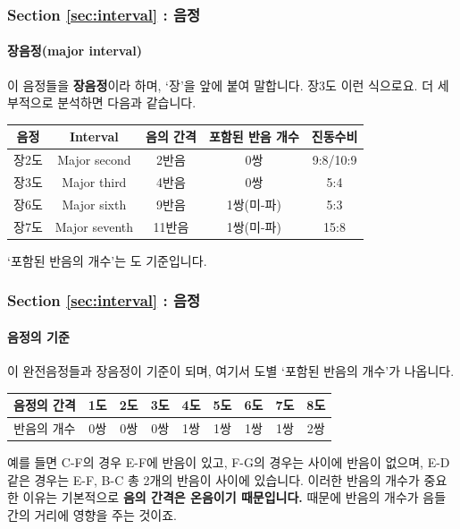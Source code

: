 \documentclass{beamer}
\begin{document}
	\begin{frame}
		\frametitle{Section \ref{sec:interval} : 음정}
		\framesubtitle{장음정(major interval)}
		이 음정들을 {\bf 장음정}이라 하며, `장'을 앞에 붙여 말합니다. 장3도 이런 식으로요. 더 세부적으로 분석하면 다음과 같습니다.
		\begin{table}[!h]
			\centering
			\small
			\begin{tabular}{|c|c|c|c|c|}
				\hline
				음정 & Interval & 음의 간격 & 포함된 반음 개수 & 진동수비 \\ \hline
				장2도  &  Major second  &  2반음  &  0쌍  &  9:8/10:9  \\ \hline
				장3도  &  Major third  &  4반음  &  0쌍  &  5:4  \\ \hline
				장6도  &  Major sixth  &  9반음  &  1쌍(미-파)  &  5:3  \\ \hline
				장7도  &  Major seventh & 11반음  &  1쌍(미-파)  &  15:8  \\ \hline
			\end{tabular}
		\end{table}
		`포함된 반음의 개수'는 도 기준입니다.
	\end{frame}
	
	\begin{frame}
		\frametitle{Section \ref{sec:interval} : 음정}
		\framesubtitle{음정의 기준}
		이 완전음정들과 장음정이 기준이 되며, 여기서 도별 `포함된 반음의 개수'가 나옵니다.
		\begin{table}[!h]
			\centering
			\begin{tabular}{|c|c|c|c|c|c|c|c|c|}
				\hline
				음정의 간격 & 1도 & 2도 & 3도 & 4도 & 5도 & 6도 & 7도 & 8도 \\ \hline
				반음의 개수 & 0쌍 & 0쌍 & 0쌍 & 1쌍 & 1쌍 & 1쌍 & 1쌍 & 2쌍 \\ \hline
			\end{tabular}
		\end{table}
		예를 들면 C-F의 경우 E-F에 반음이 있고, F-G의 경우는 사이에 반음이 없으며, E-D같은 경우는 E-F, B-C 총 2개의 반음이 사이에 있습니다. 이러한 반음의 개수가 중요한 이유는 기본적으로 {\bf 음의 간격은 온음이기 때문입니다.} 때문에 반음의 개수가 음들 간의 거리에 영향을 주는 것이죠.
	\end{frame}
	
\end{document}
